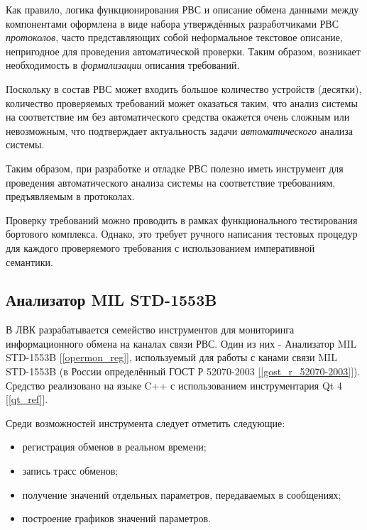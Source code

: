 Как правило, логика функционирования РВС и описание обмена данными между 
компонентами оформлена в виде набора утверждённых 
разработчиками РВС \textit{протоколов}, часто представляющих собой неформальное 
текстовое описание, непригодное для проведения автоматической проверки.
Таким образом, возникает необходимость в \textit{формализации} описания 
требований.

Поскольку в состав РВС может входить большое количество устройств (десятки), 
количество проверяемых требований может оказаться таким, что анализ 
системы на соответствие им без автоматического средства окажется очень сложным 
или невозможным, что подтверждает актуальность задачи \textit{автоматического} 
анализа системы.

Таким образом, при разработке и отладке РВС полезно иметь инструмент для 
проведения автоматического анализа системы на соответствие требованиям, 
предъявляемым в протоколах.

Проверку требований можно проводить в рамках функционального тестирования 
бортового комплекса. Однако, это требует ручного написания тестовых процедур 
для каждого проверяемого требования с использованием императивной семантики.

\subsection{Анализатор MIL STD-1553B}

В ЛВК разрабатывается семейство инструментов для мониторинга информационного 
обмена на каналах связи РВС. Один из них - Анализатор MIL STD-1553B 
[\ref{opermon_reg}], используемый для работы с канами связи MIL STD-1553B 
(в России определённый ГОСТ Р 52070-2003 [\ref{gost_r_52070-2003}]). Средство 
реализовано на языке C++ с использованием инструментария Qt 4 [\ref{qt_ref}].

Среди возможностей инструмента следует отметить следующие:

\begin{itemize}
 \item регистрация обменов в реальном времени;
 \item запись трасс обменов;
 \item получение значений отдельных параметров, передаваемых в сообщениях;
 \item построение графиков значений параметров.
\end{itemize}

